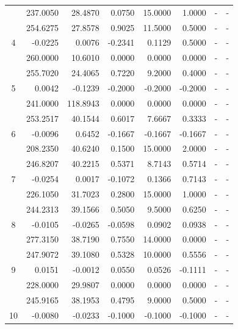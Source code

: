 \begin{table}[!htb]
{\begin{tabular}{c|r|r|r|r|r|r|r}
 & 237.0050 & 28.4870 & 0.0750 & 15.0000 & 1.0000 & - & - \\ \cline{2-8} 
 & 254.6275 & 27.8578 & 0.9025 & 11.5000 & 0.5000 & - & - \\ \cline{2-8} 
\multirow{-3}{*}{4} & \cellcolor[HTML]{ADDDAD}-0.0225 & \cellcolor[HTML]{ADDDAD}0.0076 & -0.2341 & 0.1129 & 0.5000 & - & - \\ \hline
 & 260.0000 & 10.6010 & 0.0000 & 0.0000 & 0.0000 & - & - \\ \cline{2-8} 
 & 255.7020 & 24.4065 & 0.7220 & 9.2000 & 0.4000 & - & - \\ \cline{2-8} 
\multirow{-3}{*}{5} & \cellcolor[HTML]{ADDDAD}0.0042 & -0.1239 & -0.2000 & -0.2000 & -0.2000 & - & - \\ \hline
 & 241.0000 & 118.8943 & 0.0000 & 0.0000 & 0.0000 & - & - \\ \cline{2-8} 
 & 253.2517 & 40.1544 & 0.6017 & 7.6667 & 0.3333 & - & - \\ \cline{2-8} 
\multirow{-3}{*}{6} & \cellcolor[HTML]{ADDDAD}-0.0096 & 0.6452 & -0.1667 & -0.1667 & -0.1667 & - & - \\ \hline
 & 208.2350 & 40.6240 & 0.1500 & 15.0000 & 2.0000 & - & - \\ \cline{2-8} 
 & 246.8207 & 40.2215 & 0.5371 & 8.7143 & 0.5714 & - & - \\ \cline{2-8} 
\multirow{-3}{*}{7} & \cellcolor[HTML]{ADDDAD}-0.0254 & \cellcolor[HTML]{ADDDAD}0.0017 & -0.1072 & 0.1366 & 0.7143 & - & - \\ \hline
 & 226.1050 & 31.7023 & 0.2800 & 15.0000 & 1.0000 & - & - \\ \cline{2-8} 
 & 244.2313 & 39.1566 & 0.5050 & 9.5000 & 0.6250 & - & - \\ \cline{2-8} 
\multirow{-3}{*}{8} & \cellcolor[HTML]{ADDDAD}-0.0105 & \cellcolor[HTML]{ADDDAD}-0.0265 & -0.0598 & 0.0902 & 0.0938 & - & - \\ \hline
 & 277.3150 & 38.7190 & 0.7550 & 14.0000 & 0.0000 & - & - \\ \cline{2-8} 
 & 247.9072 & 39.1080 & 0.5328 & 10.0000 & 0.5556 & - & - \\ \cline{2-8} 
\multirow{-3}{*}{9} & \cellcolor[HTML]{ADDDAD}0.0151 & \cellcolor[HTML]{ADDDAD}-0.0012 & 0.0550 & 0.0526 & -0.1111 & - & - \\ \hline
 & 228.0000 & 29.9807 & 0.0000 & 0.0000 & 0.0000 & - & - \\ \cline{2-8} 
 & 245.9165 & 38.1953 & 0.4795 & 9.0000 & 0.5000 & - & - \\ \cline{2-8} 
\multirow{-3}{*}{10} & \cellcolor[HTML]{ADDDAD}-0.0080 & \cellcolor[HTML]{ADDDAD}-0.0233 & -0.1000 & -0.1000 & -0.1000 & - & - \\ \hline

\end{tabular}}
\end{table}
